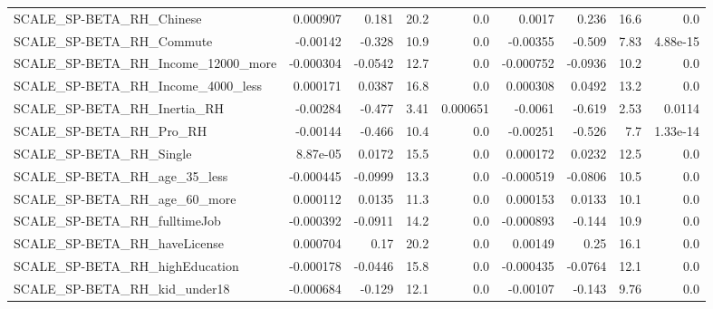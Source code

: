 \begin{tabular}{lrrrrrrrr}
SCALE\_SP-BETA\_RH\_Chinese                           &    0.000907 &        0.181 &     20.2 &      0.0 &     0.0017 &       0.236 &         16.6 &           0.0 \\
SCALE\_SP-BETA\_RH\_Commute                           &    -0.00142 &       -0.328 &     10.9 &      0.0 &   -0.00355 &      -0.509 &         7.83 &      4.88e-15 \\
SCALE\_SP-BETA\_RH\_Income\_12000\_more                 &   -0.000304 &      -0.0542 &     12.7 &      0.0 &  -0.000752 &     -0.0936 &         10.2 &           0.0 \\
SCALE\_SP-BETA\_RH\_Income\_4000\_less                  &    0.000171 &       0.0387 &     16.8 &      0.0 &   0.000308 &      0.0492 &         13.2 &           0.0 \\
SCALE\_SP-BETA\_RH\_Inertia\_RH                        &    -0.00284 &       -0.477 &     3.41 & 0.000651 &    -0.0061 &      -0.619 &         2.53 &        0.0114 \\
SCALE\_SP-BETA\_RH\_Pro\_RH                            &    -0.00144 &       -0.466 &     10.4 &      0.0 &   -0.00251 &      -0.526 &          7.7 &      1.33e-14 \\
SCALE\_SP-BETA\_RH\_Single                            &    8.87e-05 &       0.0172 &     15.5 &      0.0 &   0.000172 &      0.0232 &         12.5 &           0.0 \\
SCALE\_SP-BETA\_RH\_age\_35\_less                       &   -0.000445 &      -0.0999 &     13.3 &      0.0 &  -0.000519 &     -0.0806 &         10.5 &           0.0 \\
SCALE\_SP-BETA\_RH\_age\_60\_more                       &    0.000112 &       0.0135 &     11.3 &      0.0 &   0.000153 &      0.0133 &         10.1 &           0.0 \\
SCALE\_SP-BETA\_RH\_fulltimeJob                       &   -0.000392 &      -0.0911 &     14.2 &      0.0 &  -0.000893 &      -0.144 &         10.9 &           0.0 \\
SCALE\_SP-BETA\_RH\_haveLicense                       &    0.000704 &         0.17 &     20.2 &      0.0 &    0.00149 &        0.25 &         16.1 &           0.0 \\
SCALE\_SP-BETA\_RH\_highEducation                     &   -0.000178 &      -0.0446 &     15.8 &      0.0 &  -0.000435 &     -0.0764 &         12.1 &           0.0 \\
SCALE\_SP-BETA\_RH\_kid\_under18                       &   -0.000684 &       -0.129 &     12.1 &      0.0 &   -0.00107 &      -0.143 &         9.76 &           0.0 \\

\end{tabular}
